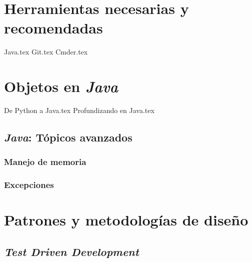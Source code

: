 \documentclass[12pt]{book}
\begin{document}
  \frontmatter
  \maketitle
  \tableofcontents
  

  \mainmatter
  \part{Herramientas necesarias y recomendadas}
    {Java.tex}
    {Git.tex}
    {Cmder.tex}
  \part{Objetos en \textit{Java}}
    
    {De Python a Java.tex}
    {Profundizando en Java.tex}
    \chapter{\textit{Java}: Tópicos avanzados}
      \label{ch:java-2}
      \section{Manejo de memoria}
        \label{sec:memory}
      \section{Excepciones}
        \label{sec:exceptions}
  \part{Patrones y metodologías de diseño}
    \chapter{\textit{Test Driven Development}}
      \label{ch:tdd}
\end{document}
